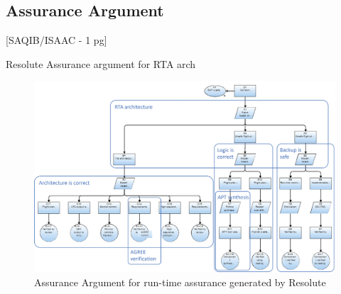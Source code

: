 \subsection{Assurance Argument}

[SAQIB/ISAAC - 1 pg]

Resolute Assurance argument for RTA arch


\begin{figure}
	\centering
	\includegraphics[width=\textwidth]{figures/rta-resolute.jpg}
	\caption{Assurance Argument for run-time assurance generated by Resolute}
	\label{fig:rta-resolute}
\end{figure}

